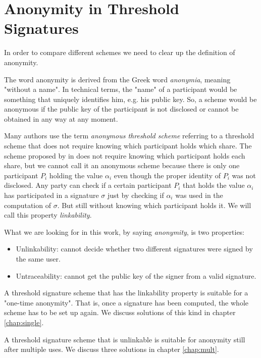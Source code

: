 \chapter{Anonymity in Threshold Signatures}
\label{chap:anon}
In order to compare different schemes we need to clear up the definition of anonymity.

The word anonymity is derived from the Greek word \textit{anonymia}, meaning "without a name". In technical terms, the "name" of a participant would be something that uniquely identifies him, e.g. his public key. So, a scheme would be anonymous if the public key of the participant is not disclosed or cannot be obtained in any way at any moment.

Many authors use the term \textit{anonymous threshold scheme} referring to a threshold scheme that does not require knowing which participant holds which share. The scheme proposed by \citeauthor{Boldyreva03} in \cite{Boldyreva03} does not require knowing which participant holds each share, but we cannot call it an anonymous scheme because there is only one participant $P_i$ holding the value $\alpha_i$ even though the proper identity of $P_i$ was not disclosed. Any party can check if a certain participant $P_i$ that holds the value $\alpha_i$ has participated in a signature $\sigma$ just by checking if $\alpha_i$ was used in the computation of $\sigma$. But still without knowing which participant holds it. We will call this property \textit{linkability}.

What we are looking for in this work, by saying \textit{anonymity}, is two properties:
\begin{itemize}
    \item Unlinkability: cannot decide whether two different signatures were signed by the same user.
    \item Untraceability: cannot get the public key of the signer from a valid signature.
\end{itemize}

A threshold signature scheme that has the linkability property is suitable for a "one-time anonymity". That is, once a signature has been computed, the whole scheme has to be set up again. We discuss solutions of this kind in chapter \ref{chap:single}.

A threshold signature scheme that is unlinkable is suitable for anonymity still after multiple uses. We discuss three solutions in chapter \ref{chap:mult}.

